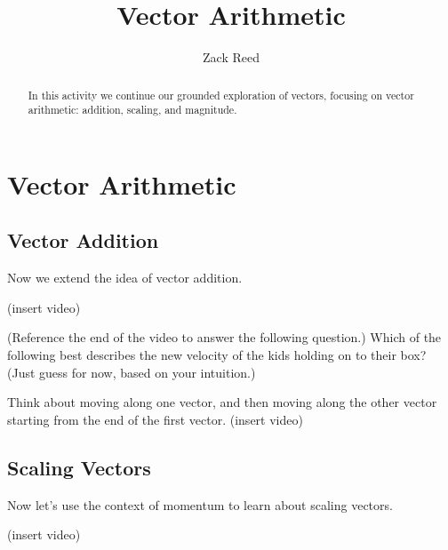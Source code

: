\documentclass{ximera}
\title{Vector Arithmetic}
\author{Zack Reed}
\begin{document}
\begin{abstract}
In this activity we continue our grounded exploration of vectors, focusing on vector arithmetic: addition, scaling, and magnitude.
\end{abstract}
\maketitle

\section*{Vector Arithmetic}

\subsection*{Vector Addition}

Now we extend the idea of vector addition.

(insert video)

\begin{problem}
(Reference the end of the video to answer the following question.)
Which of the following best describes the new velocity of the kids holding on to their box? (Just guess for now, based on your intuition.)
\begin{multipleChoice}
\end{multipleChoice}
\begin{feedback}
Think about moving along one vector, and then moving along the other vector starting from the end of the first vector.
(insert video)
\end{feedback}
\end{problem}

\subsection*{Scaling Vectors}

Now let's use the context of momentum to learn about scaling vectors.

(insert video)
\end{document}
